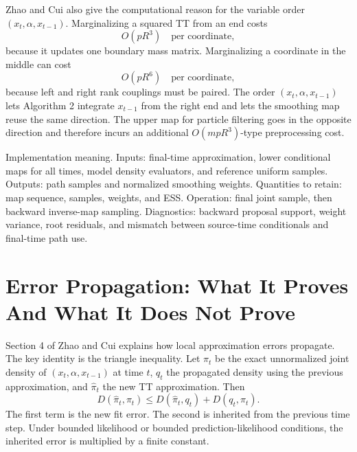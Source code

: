 \documentclass[11pt]{article}
\numberwithin{equation}{section}
\begin{document}
Zhao and Cui \cite{zhao2024ttsequential} also give the computational reason for the variable order
\((x_t,\alpha,x_{t-1})\).  Marginalizing a squared TT from an end costs
\begin{equation}
    O(pR^3)\quad\text{per coordinate},
    \label{eq:p24-b8}
\end{equation}
because it updates one boundary mass matrix.  Marginalizing a coordinate in the
middle can cost
\begin{equation}
    O(pR^6)\quad\text{per coordinate},
    \label{eq:p24-b9}
\end{equation}
because left and right rank couplings must be paired.  The order
\((x_t,\alpha,x_{t-1})\) lets Algorithm 2 integrate \(x_{t-1}\) from the right
end and lets the smoothing map reuse the same direction.  The upper map for
particle filtering goes in the opposite direction and therefore incurs an
additional \(O(mpR^3)\)-type preprocessing cost.

Implementation meaning. Inputs: final-time approximation, lower
conditional maps for all times, model density evaluators, and reference uniform
samples.  Outputs: path samples and normalized smoothing weights.  Quantities
to retain: map sequence, samples, weights, and ESS.  Operation: final joint sample,
then backward inverse-map sampling.  Diagnostics: backward proposal support,
weight variance, root residuals, and mismatch between source-time conditionals
and final-time path use.

\section{Error Propagation: What It Proves And What It Does Not Prove}

Section 4 of Zhao and Cui \cite{zhao2024ttsequential} explains how local approximation errors propagate.  The
key identity is the triangle inequality.  Let \(\pi_t\) be the exact
unnormalized joint density of \((x_t,\alpha,x_{t-1})\) at time \(t\), \(q_t\)
the propagated density using the previous approximation, and
\(\widehat\pi_t\) the new TT approximation.  Then
\begin{equation}
    D(\widehat\pi_t,\pi_t)
    \le
    D(\widehat\pi_t,q_t)+D(q_t,\pi_t).
    \label{eq:p24-e1}
\end{equation}
The first term is the new fit error.  The second is inherited from the previous
time step.  Under bounded likelihood or bounded prediction-likelihood
conditions, the inherited error is multiplied by a finite constant.
\end{document}
